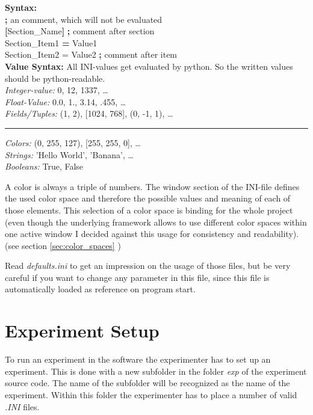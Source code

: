 \documentclass[12pt,a4paper]{book}
\begin{document}
\begin{center}
\begin{minipage}{0.85\linewidth}
\textbf{Syntax:}\\
\textbf{;} an comment, which will not be evaluated\\
\textbf{[}Section\_Name\textbf{]} \textbf{;} comment after section\\
Section\_Item1 \textbf{=} Value1\\
Section\_Item2 = Value2 \textbf{;} comment after item\\

\textbf{Value Syntax:} All INI-values get evaluated by python. So the written values should be python-readable.\\
\textit{Integer-value:} 0, 12, 1337, \dots \\
\textit{Float-Value:} 0.0, 1., 3.14, .455, \dots \\
\textit{Fields/Tuples:} (1, 2), [1024, 768], (0, -1, 1), \dots \\
\rule{2em}{0em} \textit{Colors:} (0, 255, 127), [255, 255, 0], \dots \\
\textit{Strings:} 'Hello World', 'Banana', \dots \\
\textit{Booleans:} True, False
\end{minipage}
\end{center}

A color is always a triple of numbers. The window section of the INI-file defines the used color space and therefore the possible values and meaning of each of those elements. This selection of a color space is binding for the whole project (even though the underlying framework allows to use different color spaces within one active window I decided against this usage for consistency and readability). (see section \ref{sec:color_spaces} )

Read \emph{defaults.ini} to get an impression on the usage of those files, but be very careful if you want to change any parameter in this file, since this file is automatically loaded as reference on program start.

\section{Experiment Setup}

To run an experiment in the software the experimenter has to set up an experiment. This is done with a new subfolder in the folder \textit{exp} of the experiment source code. The name of the subfolder will be recognized as the name of the experiment. Within this folder the experimenter has to place a number of valid \textit{.INI} files.
\end{document}
